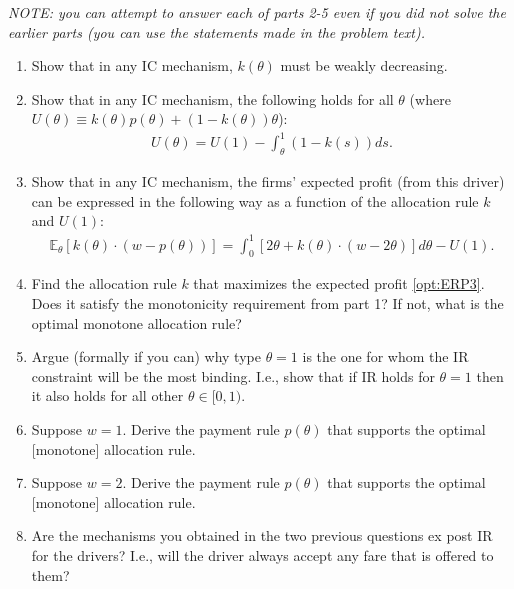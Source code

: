 \documentclass[a4paper]{article}
\begin{document}
	\emph{NOTE: you can attempt to answer each of parts 2-5 even if you did not solve the earlier parts (you can use the statements made in the problem text).}
	
	\begin{enumerate}
		\item Show that in any IC mechanism, $k(\theta)$ must be weakly decreasing.
		\item Show that in any IC mechanism, the following holds for all $\theta$ (where $U(\theta) \equiv k(\theta) p(\theta) + (1-k(\theta)) \theta$):
		\begin{align}
			\label{opt:ERP2}
			U(\theta) = U(1) - \int_{\theta}^{1} (1-k(s)) ds.
		\end{align}
		\item Show that in any IC mechanism, the firms' expected profit (from this driver) can be expressed in the following way as a function of the allocation rule $k$ and $U(1)$:
		\begin{align}
			\label{opt:ERP3}
			\mathbb{E}_\theta [k(\theta)\cdot (w-p(\theta))] = \int_0^1 \left[ 2\theta + k(\theta) \cdot (w - 2\theta ) \right] d\theta - U(1).
		\end{align}
		\item Find the allocation rule $k$ that maximizes the expected profit \eqref{opt:ERP3}. Does it satisfy the monotonicity requirement from part 1? If not, what is the optimal monotone allocation rule?
		\item Argue (formally if you can) why type $\theta=1$ is the one for whom the IR constraint will be the most binding. I.e., show that if IR holds for $\theta=1$ then it also holds for all other $\theta \in [0,1)$.
		\item Suppose $w=1$. Derive the payment rule $p(\theta)$ that supports the optimal [monotone] allocation rule.
		\item Suppose $w=2$. Derive the payment rule $p(\theta)$ that supports the optimal [monotone] allocation rule.
		\item Are the mechanisms you obtained in the two previous questions ex post IR for the drivers? I.e., will the driver always accept any fare that is offered to them?
	\end{enumerate}
	
\end{document}

